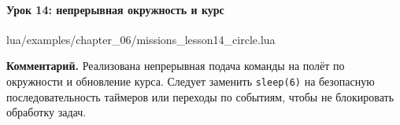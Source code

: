\paragraph{Урок 14: непрерывная окружность и курс}
\begin{codefile}{lua/examples/chapter_06/missions_lesson14_circle.lua}
\end{codefile}
\textbf{Комментарий.} Реализована непрерывная подача команды на полёт по окружности и обновление курса. Следует заменить \texttt{sleep(6)} на безопасную последовательность таймеров или переходы по событиям, чтобы не блокировать обработку задач.
